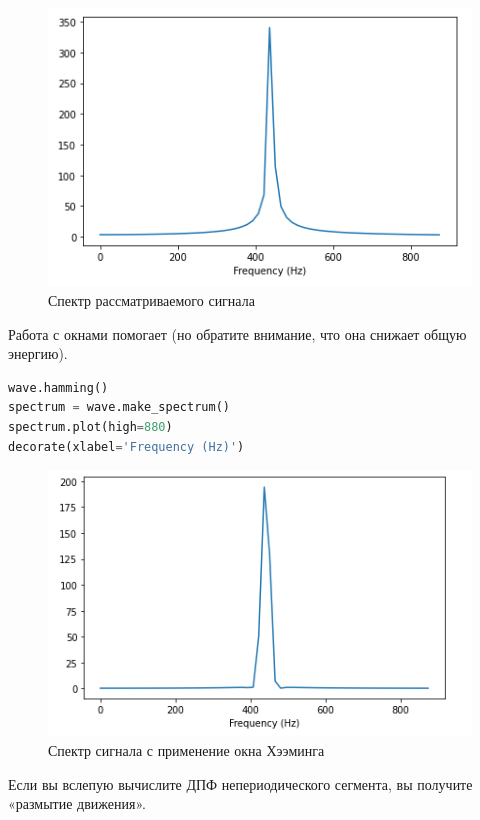 \begin{figure}[H]
	\begin{center}
		\includegraphics[scale=1]{fig/lab03/lab03_04.png}
		\caption{Спектр рассматриваемого сигнала}
	\end{center}
\end{figure}

Работа с окнами помогает (но обратите внимание, что она снижает общую энергию).

\begin{lstlisting}[language=Python]
wave.hamming()
spectrum = wave.make_spectrum()
spectrum.plot(high=880)
decorate(xlabel='Frequency (Hz)')
\end{lstlisting}

\begin{figure}[H]
	\begin{center}
		\includegraphics[scale=1]{fig/lab03/lab03_05.png}
		\caption{Спектр сигнала с применение окна Хээминга}
	\end{center}
\end{figure}

Если вы вслепую вычислите ДПФ непериодического сегмента, вы получите «размытие движения».

